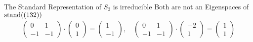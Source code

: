\begin{frame}{The Standard Representation of $S_3$ is irreducible}
%    
    \pause
    \vspace{1em}
    Both are not an Eigenspaces of $\operatorname{stand}((132))$
    \begin{align*}
        \begin{pmatrix}
            0 & 1 \\
            -1 & -1
        \end{pmatrix} \cdot \begin{pmatrix}
            0 \\ 1
        \end{pmatrix} = \begin{pmatrix}
            1 \\ -1
        \end{pmatrix}, \quad \begin{pmatrix}
            0 & 1 \\
            -1 & -1
        \end{pmatrix} \cdot \begin{pmatrix}
            -2 \\ 1
        \end{pmatrix} = \begin{pmatrix}
            1 \\ 1
        \end{pmatrix}
    \end{align*}
\end{frame}

